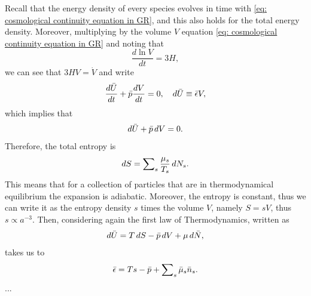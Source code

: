 Recall that the energy density of every species evolves in time with \eqref{eq: cosmological continuity equation in GR}, and this also holds for the total energy density. Moreover, multiplying by the volume $V$ equation \eqref{eq: cosmological continuity equation in GR} and noting that 
\begin{equation}
    \frac{d\ln{V}}{dt} = 3H,
\end{equation}
we can see that $3HV = \dot{V}$ and write 
\begin{equation}
    \frac{d\bar{U}}{dt} + \bar{p}\frac{dV}{dt} = 0,\quad d\bar{U} \equiv \bar{\epsilon}V,
\end{equation}
which implies that 
\begin{equation}
    d\bar{U} + \bar{p}\,dV = 0.
\end{equation}
Therefore, the total entropy is 
\begin{equation}
    dS = \sum\nolimits_s\frac{\mu_s}{T_s}\,dN_s.
\end{equation}
This means that for a collection of particles that are in thermodynamical equilibrium the expansion is adiabatic. Moreover, the entropy is constant, thus we can write it as the entropy density $s$ times the volume $V$, namely $S = sV$, thus $s \propto a^{-3}$. Then, considering again the first law of Thermodynamics, written as 
\begin{equation}
    d\bar{U} = T\,dS - \bar{p}\,dV + \mu\,d\bar{N},
\end{equation}
takes us to 
\begin{equation}
    \bar{\epsilon} = Ts - \bar{p} + \sum\nolimits_s \bar{\mu}_s\bar{n}_s.
\end{equation}
... 

